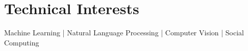 \documentclass[a4paper,10pt]{extarticle} %
\begin{document}










\vspace{-0.3cm}
\section{\textcolor{primary}{Technical Interests}}

\noindent Machine Learning | Natural Language Processing | Computer Vision | Social Computing \\%


\end{document}
